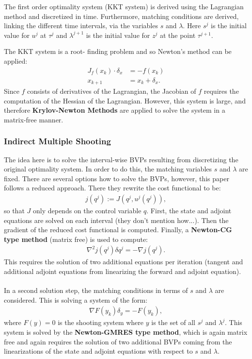 \documentclass[11pt, a4paper]{article}
\theoremstyle{definition}
\begin{document}
The first order optimality system (KKT system) is derived using the Lagrangian method and discretized in time. Furthermore, matching conditions are derived, linking the different time intervals, via the variables $s$ and $\lambda$. Here $s^j$ is the initial value for $u^j$ at $\tau^j$ and  $\lambda^{j+1}$ is the initial value for $z^j$ at the point $\tau^{j+1}$.

The KKT system is a root- finding problem and so Newton's method can be applied:
\begin{align*}
J_f(x_k) \cdot \delta_x &= -f(x_k)\\
x_{k+1} &= x_k + \delta_x.
\end{align*} 
Since $f$ consists of derivatives of the Lagrangian, the Jacobian of $f$ requires the computation of the Hessian of the Lagrangian.
However, this system is large, and therefore \textbf{Krylov-Newton Methods} are applied to solve the system in a matrix-free manner.

\subsubsection{Indirect Multiple Shooting}
The idea here is to solve the interval-wise BVPs resulting from discretizing the original optimality system. In order to do this, the matching variables $s$ and $\lambda$ are fixed.
There are several options how to solve the BVPs, however, this paper follows a reduced approach. There they rewrite the cost functional to be:
\begin{align*}
j(q^j):=J(q^j,u^j(q^j)),
\end{align*}
so that $J$ only depends on the control variable $q$. 
First, the state and adjoint equations are solved on each interval (they don't mention how...). 
Then the gradient of the reduced cost functional is computed.
Finally, a \textbf{Newton-CG type method} (matrix free) is used to compute:
\begin{align*}
\nabla^2 j(q^j)\delta q^j = - \nabla j(q^j).
\end{align*}
This requires the solution of two additional equations per iteration (tangent and additional adjoint equations from linearizing the forward and adjoint equation).
\\
\\
In a second solution step, the matching conditions in terms of $s$ and $\lambda$ are considered. This is solving a system of the form:
\begin{align*}
\nabla F(y_k)\delta_y = -F(y_k),
\end{align*}
where $F(y)=0$ is the shooting system where $y$ is the set of all $s^j$ and $\lambda^j$.
This system is solved by the \textbf{Newton-GMRES type method}, which is again matrix free and again requires the solution of two additional BVPs coming from the linearizations of the state and adjoint equations with respect to $s$ and $\lambda$.
\end{document}
